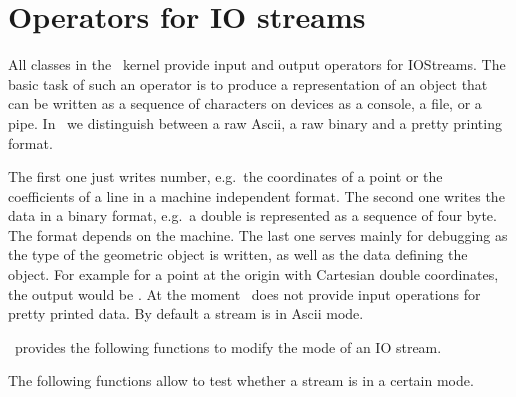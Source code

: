
\cleardoublepage
\chapter{Operators for IO streams}\label{ChapterIO}

All classes in the \cgal\ kernel provide input and output operators for
IOStreams.  The basic task of such an operator is to produce a
representation of an object that can be written as a sequence of
characters on devices as a console, a file, or a pipe. In \cgal\ 
we distinguish between  a raw {\sc Ascii}, a raw binary and a 
pretty printing format. 



The first one just writes number, e.g.\ the coordinates of a point or
the coefficients of a line in a machine independent format. The second
one writes the data in a binary format, e.g.\ a double is represented
as a sequence of four byte. The format depends on the machine. The
last one serves mainly for debugging as the type of the geometric
object is written, as well as the data defining the object. For example
for a point at the origin with Cartesian double coordinates, the output
would be \ccc{PointC2(0.0, 0.0)}.  At the moment \cgal\ does not
provide input operations for pretty printed data. By default a stream
is in {\sc Ascii} mode.


\cgal\ provides the following functions to modify the mode of an IO stream.


\ccGlue
{}
\ccGlue
{}

The following functions allow to test whether a stream is in a certain mode.


\ccGlue
{}
\ccGlue
{}


\newpage


